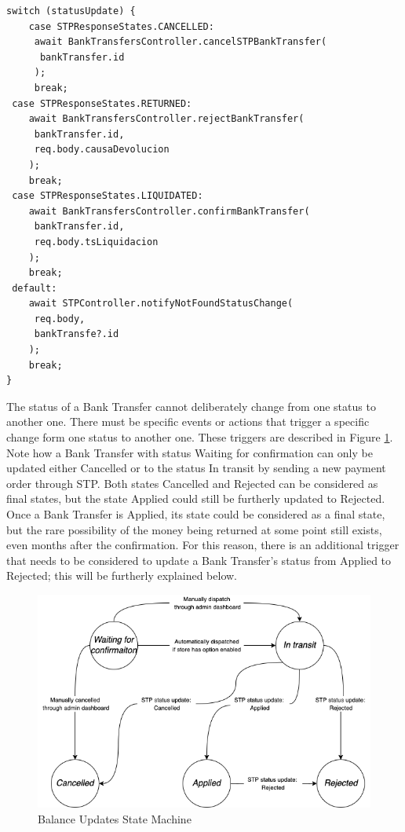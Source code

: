 \begin{verbatim}
switch (statusUpdate) {
    case STPResponseStates.CANCELLED:
     await BankTransfersController.cancelSTPBankTransfer(
      bankTransfer.id
     );
     break;
 case STPResponseStates.RETURNED:
    await BankTransfersController.rejectBankTransfer(
     bankTransfer.id,
     req.body.causaDevolucion
    );
    break;
 case STPResponseStates.LIQUIDATED:
    await BankTransfersController.confirmBankTransfer(
     bankTransfer.id,
     req.body.tsLiquidacion
    );
    break;
 default:
    await STPController.notifyNotFoundStatusChange(
     req.body,
     bankTransfe?.id
    );
    break;
}

\end{verbatim}

The status of a Bank Transfer cannot deliberately change from one status to another one. There must be specific events or actions that trigger a specific change form one status to another one. These triggers are described in Figure \ref{fig:state_machine_bank_transfers}. Note how a Bank Transfer with status Waiting for confirmation can only be updated either Cancelled or to the status In transit by sending a new payment order through STP. Both states Cancelled and Rejected can be considered as final states, but the state Applied could still be furtherly updated to Rejected. Once a Bank Transfer is Applied, its state could be considered as a final state, but the rare possibility of the money being returned at some point still exists, even months after the confirmation. For this reason, there is an additional trigger that needs to be considered to update a Bank Transfer’s status from Applied to Rejected; this will be furtherly explained below.

\begin{figure}[h!]
    \centering
    \includegraphics[scale = 0.5]{assets/diagrams/BankTransfersStateMachine.png}
    \caption{Balance Updates State Machine}\label{fig:state_machine_bank_transfers}
\end{figure}

